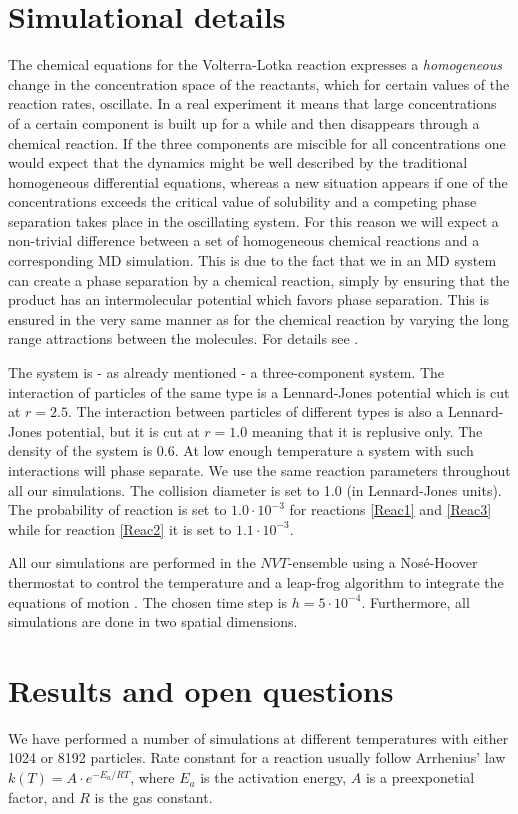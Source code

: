 \section{Simulational details}
The chemical equations for the Volterra-Lotka reaction expresses a
\textit{homogeneous} change in the concentration space of the
reactants, which for certain values of the reaction rates,
oscillate. In a real experiment it means that large concentrations of
a certain component is built up for a while and then disappears
through a chemical reaction. If the three components are miscible for
all concentrations one would expect that the dynamics might be well
described by the traditional homogeneous differential equations,
whereas a new situation appears if one of the concentrations exceeds
the critical value of solubility and a competing phase separation
takes place in the oscillating system.  For this
reason we will expect a non-trivial difference between a set of
homogeneous chemical reactions and a corresponding MD simulation.
This is due to the fact that we in an MD system can create a phase
separation by a chemical reaction, simply by ensuring that the product
has an intermolecular potential which favors phase separation. This is
ensured in the  very same manner as for the chemical reaction by
varying the long range attractions between the molecules. For details
see \eg \cite{tox3}.

The system is - as already mentioned - a three-component system. The 
interaction of particles of the same type is a Lennard-Jones potential
which is cut at $r = 2.5$. The interaction between particles of different
types is also a Lennard-Jones potential, but it is cut at $r=1.0$ 
meaning that it is replusive only. The density of the system is
$0.6$. At low enough temperature a system with such interactions will
phase separate. We use the same reaction parameters 
throughout all our simulations. The collision diameter is set to 1.0 
(in Lennard-Jones units). 
The probability of reaction is set to 
$1.0\cdot 10^{-3}$ for reactions \ref{Reac1} and \ref{Reac3} while 
for reaction \ref{Reac2} it is set to $1.1\cdot 10^{-3}$.

All our simulations are performed in the $NVT$-ensemble using a 
Nos\'{e}-Hoover thermostat to control the temperature and a leap-frog
algorithm to integrate the equations of motion \cite{toxvaerd}. The
chosen time step is $h = 5\cdot 10^{-4}$. Furthermore, all simulations are
done in two spatial dimensions.

\section{Results and open questions}                           
We have performed a number of simulations at different temperatures with 
either 1024 or 8192 particles. Rate
constant for a reaction usually follow Arrhenius' law \ie
$k(T) = A\cdot e^{-E_a/RT}$, 
where $E_a$ is the activation energy, $A$ is a preexponetial factor, and $R$
is the gas constant.

